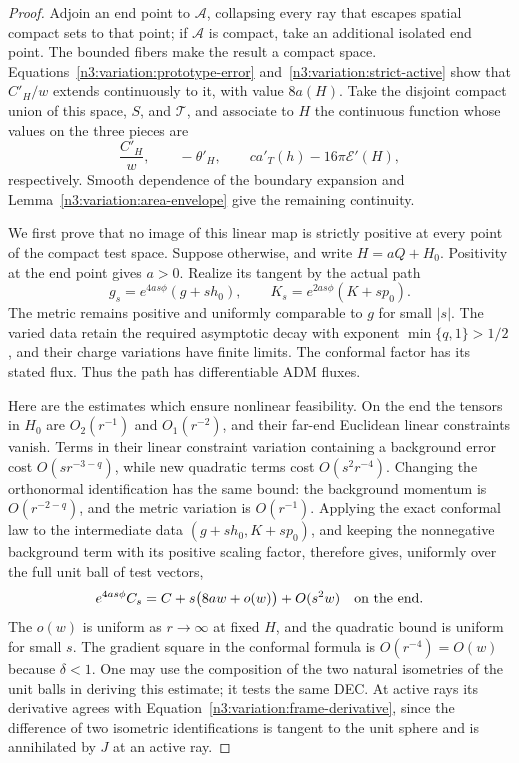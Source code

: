 \begin{proof}
Adjoin an end point to $\mathcal A$, collapsing every ray that escapes
spatial compact sets to that point; if $\mathcal A$ is compact, take
an additional isolated end point.  The bounded fibers make the
result a compact space.  Equations~\eqref{n3:variation:prototype-error}
and~\eqref{n3:variation:strict-active} show that $C'_H/w$ extends
continuously to it, with value $8a(H)$.  Take the disjoint compact
union of this space, $S$, and $\mathcal T$, and associate to $H$ the
continuous function whose values on the three pieces are
\begin{equation}
 \frac{C'_H}{w},\qquad -\theta'_H,\qquad
 c a'_T(h)-16\pi\mathcal E'(H),
 \label{n3:variation:test-map}
\end{equation}
respectively.  Smooth dependence of the boundary expansion and
Lemma~\ref{n3:variation:area-envelope} give the remaining continuity.

We first prove that no image of this linear map is strictly positive
at every point of the compact test space.  Suppose otherwise, and
write $H=aQ+H_0$.  Positivity at the end point gives $a>0$.
Realize its tangent by the actual path
\begin{equation}
 g_s=e^{4as\phi}(g+s h_0),\qquad
 K_s=e^{2as\phi}(K+s p_0).
 \label{n3:variation:feasible-path}
\end{equation}
The metric remains positive and uniformly comparable to $g$ for
small $|s|$.  The varied data retain the required asymptotic decay
with exponent $\min\{q,1\}>1/2$, and their charge variations have finite
limits.  The conformal factor has its stated flux.  Thus the path
has differentiable ADM fluxes.

Here are the estimates which ensure nonlinear feasibility.  On the
end the tensors in $H_0$ are $O_2(r^{-1})$ and $O_1(r^{-2})$, and
their far-end Euclidean linear constraints vanish.  Terms in their
linear constraint variation containing a background error cost
$O(s r^{-3-q})$, while new quadratic terms cost $O(s^2r^{-4})$.
Changing the orthonormal identification has the same bound: the
background momentum is $O(r^{-2-q})$, and the metric variation is
$O(r^{-1})$.  Applying the exact conformal law to the intermediate
data $(g+s h_0,K+s p_0)$, and keeping the nonnegative background
term with its positive scaling factor, therefore gives, uniformly
over the full unit ball of test vectors,
\begin{equation}
 e^{4as\phi}C_s
  =C+s\bigl(8a w+o(w)\bigr)+O(s^2w)
  \quad\hbox{on the end}.
 \label{n3:variation:nonlinear-end}
\end{equation}
The $o(w)$ is uniform as $r\to\infty$ at fixed $H$, and the
quadratic bound is uniform for small $s$.  The gradient square in
the conformal formula is $O(r^{-4})=O(w)$ because $\delta<1$.
One may use the composition of the two natural isometries of the
unit balls in deriving this estimate; it tests the same DEC.
At active rays its derivative agrees with
Equation~\eqref{n3:variation:frame-derivative}, since the difference of
two isometric identifications is tangent to the unit sphere and is
annihilated by $J$ at an active ray.


\end{proof}
